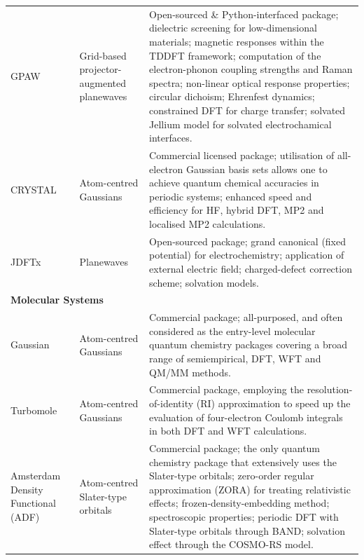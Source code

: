 \begin{longtable}{p{2cm}p{3cm}p{12.5cm}}
      \footnotesize{GPAW\cite{Enkovaara_2010,10.1063/5.0182685}} 
            & \footnotesize{Grid-based projector-augmented planewaves}
            & \footnotesize{Open-sourced \& Python-interfaced  package; dielectric screening for low-dimensional materials; magnetic responses within the TDDFT framework; computation of the electron-phonon coupling strengths and Raman spectra; non-linear optical response properties; circular dichoism; Ehrenfest dynamics; constrained DFT for charge transfer; solvated Jellium model for solvated electrochamical interfaces.} \\
            
      
      \footnotesize{CRYSTAL\cite{erba2017large}} 
            & \footnotesize{Atom-centred Gaussians}
            & \footnotesize{Commercial licensed  package; utilisation of all-electron Gaussian basis sets allows one to achieve quantum chemical accuracies in periodic systems; enhanced speed and efficiency for HF, hybrid DFT, MP2 and localised MP2 calculations.} \\
            
      \footnotesize{JDFTx\cite{sundararaman2017jdftx}}  
            &\footnotesize{Planewaves} 
            &\footnotesize{Open-sourced  package; grand canonical (fixed potential) for electrochemistry;  application of external electric field; charged-defect correction scheme; solvation models. } \\
\hline
      \multicolumn{2}{l}{\textbf{Molecular Systems}} &  \\
      \footnotesize{Gaussian}\cite{g16} 
            &\footnotesize{Atom-centred Gaussians} 
            &\footnotesize{Commercial  package; all-purposed, and often considered as the entry-level molecular quantum chemistry packages covering a broad range of semiempirical, DFT, WFT and QM/MM methods.} \\

      \footnotesize{Turbomole\cite{turbomole}} 
            &\footnotesize{Atom-centred Gaussians} 
            & \footnotesize{Commercial  package, employing the resolution-of-identity (RI)\cite{weigend2002fully} approximation to speed up the evaluation of four-electron Coulomb integrals in both DFT and WFT calculations. }\\

    \footnotesize{Amsterdam Density Functional (ADF)\cite{te2001chemistry}} 
            & \footnotesize{Atom-centred Slater-type orbitals} 
            & \footnotesize{Commercial package; the only quantum chemistry package that extensively uses the Slater-type orbitals; zero-order regular approximation (ZORA)\cite{van1999geometry} for treating relativistic effects; frozen-density-embedding method\cite{wesolowski2015frozen}; spectroscopic properties; periodic DFT with Slater-type orbitals through BAND; solvation effect through the COSMO-RS model\cite{klamt2018cosmo}.}\\
      

\end{longtable}
